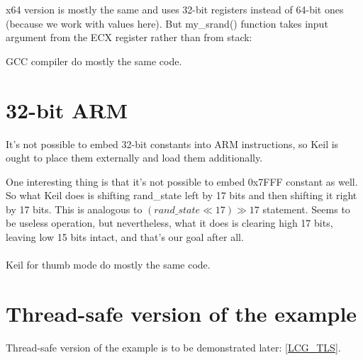 x64 version is mostly the same and uses 32-bit registers instead of 64-bit ones 
(because we work with \Tint values here).
But my\_srand() function takes input argument from the ECX register rather than from stack:



GCC compiler do mostly the same code.

\section{32-bit ARM}



It's not possible to embed 32-bit constants into ARM instructions, so Keil is ought to place them externally
and load them additionally.

One interesting thing is that it's not possible to embed 0x7FFF constant as well.
So what Keil does is shifting rand\_state left by 17 bits and then shifting it right by 17 bits.
This is analogous to $(rand\_state \ll 17) \gg 17$ statement. 
Seems to be useless operation, but nevertheless,
what it does is clearing high 17 bits, leaving low 15 bits intact, and that's our goal after all.\\
\\
\Optimizing Keil for thumb mode do mostly the same code.

\section{Thread-safe version of the example}

Thread-safe version of the example is to be demonstrated later: \ref{LCG_TLS}.

\fi
